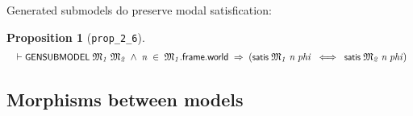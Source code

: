 \documentclass[letterpaper]{article}
\newtheorem{prop}{Proposition}
\renewcommand{\HOLConst}[1]{{\textsf{\upshape\small #1}}}
\newenvironment{holmath}{\begin{displaymath}\begin{array}{l}}{\end{array}\end{displaymath}\ignorespacesafterend}
\begin{document}
Generated submodels do preserve modal satisfication:
\begin{prop}[\texttt{prop_2_6}]
\begin{holmath}
  \ensuremath{\HOLTokenTurnstile}\HOLConst{GENSUBMODEL}\;\HOLFreeVar{\ensuremath{\mathfrak{M}\sb{1}}}\;\HOLFreeVar{\ensuremath{\mathfrak{M}\sb{2}}}\;\HOLSymConst{\HOLTokenConj{}}\;\HOLFreeVar{n}\;\HOLSymConst{\HOLTokenIn{}}\;\HOLFreeVar{\ensuremath{\mathfrak{M}\sb{1}}}.\HOLFieldName{frame}.\HOLFieldName{world}\;\HOLSymConst{\HOLTokenImp{}}\;(\HOLConst{satis}\;\HOLFreeVar{\ensuremath{\mathfrak{M}\sb{1}}}\;\HOLFreeVar{n}\;\HOLFreeVar{phi}\;\HOLSymConst{\HOLTokenEquiv{}}\;\HOLConst{satis}\;\HOLFreeVar{\ensuremath{\mathfrak{M}\sb{2}}}\;\HOLFreeVar{n}\;\HOLFreeVar{phi})
\end{holmath}
\end{prop}


\subsection{Morphisms between models}
\end{document}
